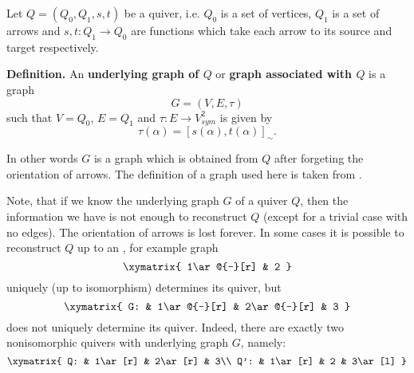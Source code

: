 \documentclass[12pt]{article}
\begin{document}
Let $Q=(Q_0,Q_1,s,t)$ be a quiver, i.e. $Q_0$ is a set of vertices, $Q_1$ is a set of arrows and $s,t:Q_1\to Q_0$ are functions which take each arrow to its source and target respectively.

\textbf{Definition.} An \textbf{underlying graph of $Q$} or \textbf{graph associated with $Q$} is a graph
$$G=(V,E,\tau)$$
such that $V=Q_0$, $E=Q_1$ and $\tau:E\to V^2_{sym}$ is given by
$$\tau(\alpha)=[s(\alpha),t(\alpha)]_{\sim}.$$

In other words $G$ is a graph which is obtained from $Q$ after forgeting the orientation of arrows. The definition of a graph used here is taken from .

Note, that if we know the underlying graph $G$ of a quiver $Q$, then the information we have is not enough to reconstruct $Q$ (except for a trivial case with no edges). The orientation of arrows is lost forever. In some cases it is possible to reconstruct $Q$ up to an , for example graph
$$\xymatrix{
1\ar@{-}[r] & 2
}$$
uniquely (up to isomorphism) determines its quiver, but
$$\xymatrix{
G: & 1\ar@{-}[r] & 2\ar@{-}[r] & 3
}$$
does not uniquely determine its quiver. Indeed, there are exactly two nonisomorphic quivers with underlying graph $G$, namely:
$$\xymatrix{
Q: & 1\ar[r] & 2\ar[r] & 3\\
Q': & 1\ar[r] & 2 & 3\ar[l]
}$$
\end{document}
